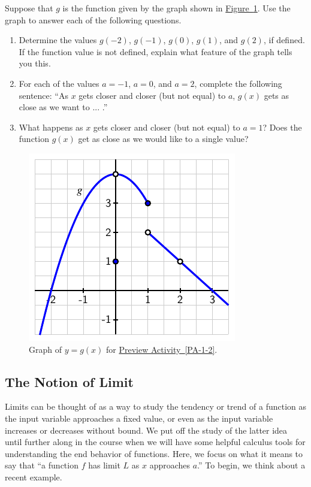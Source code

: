\documentclass[10pt,]{book}
\theoremstyle{plain}
\theoremstyle{definition}
\theoremstyle{definition}
\theoremstyle{definition}
\theoremstyle{definition}
\theoremstyle{definition}
\numberwithin{equation}{section}
\begin{document}
    Suppose that \(g\) is the function given by the graph shown in \hyperref[F-1-2-PA1]{Figure~\ref{F-1-2-PA1}}. Use the graph to answer each of the following questions.
\leavevmode%
\begin{enumerate}[label=\alph*]
\item\hypertarget{li-43}{}Determine the values \(g(-2)\), \(g(-1)\), \(g(0)\), \(g(1)\), and \(g(2)\), if defined.  If the function value is not defined, explain what feature of the graph tells you this.%
\item\hypertarget{li-44}{}For each of the values \(a = -1\), \(a = 0\), and \(a = 2\), complete the following sentence: ``As \(x\) gets closer and closer (but not equal) to \(a\), \(g(x)\) gets as close as we want to ... .''%
\item\hypertarget{li-45}{}What happens as \(x\) gets closer and closer (but not equal) to \(a = 1\)?  Does the function \(g(x)\) get as close as we would like to a single value?%
\end{enumerate}
\leavevmode%
\begin{figure}
\centering
\includegraphics[width=0.5\linewidth]{images/1_2_PA1}
\caption{Graph of \(y = g(x)\) for \hyperref[PA-1-2]{Preview Activity~\ref{PA-1-2}}.\label{F-1-2-PA1}}
\end{figure}
\typeout{************************************************}
\typeout{************************************************}
\subsection[{The Notion of Limit}]{The Notion of Limit}\label{subsection-6}

Limits can be thought of as a way to study the tendency or trend of a function as the input variable approaches a fixed value, or even as the input variable increases or decreases without bound. We put off the study of the latter idea until further along in the course when we will have some helpful calculus tools for understanding the end behavior of functions. Here, we focus on what it means to say that ``a function \(f\) has limit \(L\) as \(x\) approaches \(a\).'' To begin, we think about a recent example.
%
\par
\end{document}
